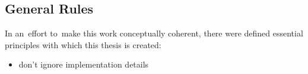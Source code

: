 \documentclass[thesis=M,english,hidelinks]{FITthesis}[2012/10/20]
\begin{document}
\subsection{General Rules}
In an~effort to~make this work conceptually coherent, there were defined essential principles with which this thesis is created:
\begin{itemize}
    \item don't ignore implementation details
    
\end{itemize}
\end{document}
